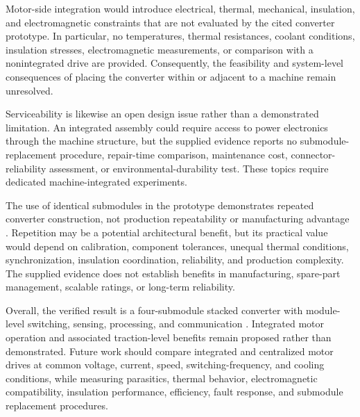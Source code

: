 Motor-side integration would introduce electrical, thermal, mechanical, insulation, and electromagnetic constraints that are not evaluated by the cited converter prototype. In particular, no temperatures, thermal resistances, coolant conditions, insulation stresses, electromagnetic measurements, or comparison with a nonintegrated drive are provided. Consequently, the feasibility and system-level consequences of placing the converter within or adjacent to a machine remain unresolved. %

Serviceability is likewise an open design issue rather than a demonstrated limitation. An integrated assembly could require access to power electronics through the machine structure, but the supplied evidence reports no submodule-replacement procedure, repair-time comparison, maintenance cost, connector-reliability assessment, or environmental-durability test. These topics require dedicated machine-integrated experiments. %

The use of identical submodules in the prototype demonstrates repeated converter construction, not production repeatability or manufacturing advantage \cite{Jin2017}. Repetition may be a potential architectural benefit, but its practical value would depend on calibration, component tolerances, unequal thermal conditions, synchronization, insulation coordination, reliability, and production complexity. The supplied evidence does not establish benefits in manufacturing, spare-part management, scalable ratings, or long-term reliability. %

Overall, the verified result is a four-submodule stacked converter with module-level switching, sensing, processing, and communication \cite{Jin2017}. Integrated motor operation and associated traction-level benefits remain proposed rather than demonstrated. Future work should compare integrated and centralized motor drives at common voltage, current, speed, switching-frequency, and cooling conditions, while measuring parasitics, thermal behavior, electromagnetic compatibility, insulation performance, efficiency, fault response, and submodule replacement procedures. %